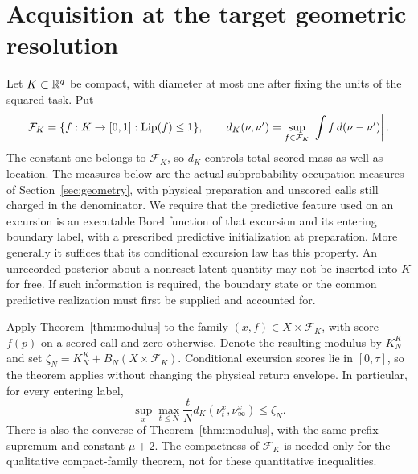 \section{Acquisition at the target geometric resolution}\label{sec:resolution}
Let $K\subset\mathbb R^q$ be compact, with diameter at most one after fixing the units of the squared task. Put
\[
 \mathcal F_K=\{f:K\to[0,1]:\operatorname{Lip}(f)\le1\},\qquad
 d_K(\nu,\nu')=\sup_{f\in\mathcal F_K}\left|\int f\,d(\nu-\nu')\right|.
\]
The constant one belongs to $\mathcal F_K$, so $d_K$ controls total scored mass as well as location. The measures below are the actual subprobability occupation measures of Section~\ref{sec:geometry}, with physical preparation and unscored calls still charged in the denominator. We require that the predictive feature used on an excursion is an executable Borel function of that excursion and its entering boundary label, with a prescribed predictive initialization at preparation. More generally it suffices that its conditional excursion law has this property. An unrecorded posterior about a nonreset latent quantity may not be inserted into $K$ for free. If such information is required, the boundary state or the common predictive realization must first be supplied and accounted for.

Apply Theorem~\ref{thm:modulus} to the family $(x,f)\in X\times\mathcal F_K$, with score $f(p)$ on a scored call and zero otherwise. Denote the resulting modulus by $K_N^{K}$ and set $\zeta_N=K_N^{K}+B_N(X\times\mathcal F_K)$. Conditional excursion scores lie in $[0,\tau]$, so the theorem applies without changing the physical return envelope. In particular, for every entering label,
\begin{equation}\label{eq:occupation-prefix}
 \sup_x\max_{t\le N}\frac tN
       d_K(\nu_t^x,\nu_\infty^x)\le\zeta_N.
\end{equation}
There is also the converse of Theorem~\ref{thm:modulus}, with the same prefix supremum and constant $\bar\mu+2$. The compactness of $\mathcal F_K$ is needed only for the qualitative compact-family theorem, not for these quantitative inequalities.

